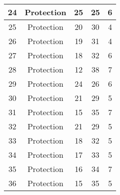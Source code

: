 \documentclass[results.tex]{subfiles}
\begin{document}
\begin{center}
\begin{tabular}{| c || c | c | c | c |}
            \hline
            24                      & Protection                   & 25                     & 25                      & 6                    \\
            \hline
            25                      & Protection                   & 20                     & 30                      & 4                    \\
            \hline
            26                      & Protection                   & 19                     & 31                      & 4                    \\
            \hline
            27                      & Protection                   & 18                     & 32                      & 6                    \\
            \hline
            28                      & Protection                   & 12                     & 38                      & 7                    \\
            \hline
            29                      & Protection                   & 24                     & 26                      & 6                    \\
            \hline
            30                      & Protection                   & 21                     & 29                      & 5                    \\
            \hline
            31                      & Protection                   & 15                     & 35                      & 7                    \\
            \hline
            32                      & Protection                   & 21                     & 29                      & 5                    \\
            \hline
            33                      & Protection                   & 18                     & 32                      & 5                    \\
            \hline
            34                      & Protection                   & 17                     & 33                      & 5                    \\
            \hline
            35                      & Protection                   & 16                     & 34                      & 7                    \\
            \hline
            36                      & Protection                   & 15                     & 35                      & 5                    \\

\end{tabular}
\end{center}
\end{document}
